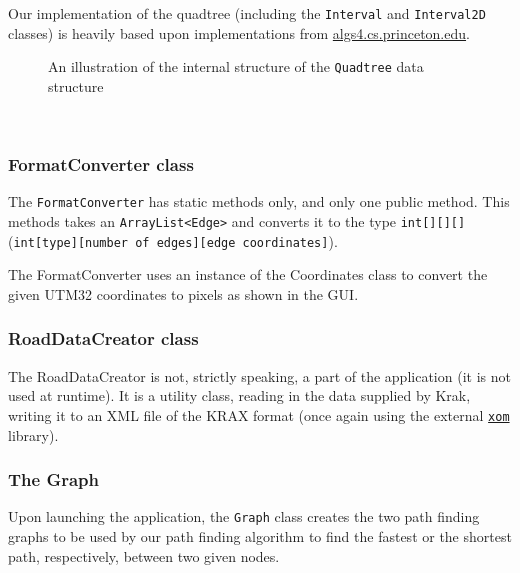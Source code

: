 \documentclass[a4paper,11pt]{article}
\begin{document}
Our implementation of the quadtree (including the \texttt{Interval} and \texttt{Interval2D} classes) is heavily based upon implementations from \url{algs4.cs.princeton.edu}.
\\
\begin{figure}[!h]
\centering
{}
	\caption{An illustration of the internal structure of the \texttt{Quadtree} data structure}
\end{figure}
\\
\subsubsection{FormatConverter class} %
The \texttt{FormatConverter} has static methods only, and only one public method. This methods takes an \texttt{ArrayList<Edge>} and converts it to the type \texttt{int[][][]} \\(\texttt{int[type][number of edges][edge coordinates]}).

The FormatConverter uses an instance of the Coordinates class to convert the given UTM32 coordinates to pixels as shown in the GUI.

\subsubsection{RoadDataCreator class} %
The RoadDataCreator is not, strictly speaking, a part of the application (it is not used at runtime). It is a utility class, reading in the data supplied by Krak, writing it to an XML file of the KRAX format (once again using the external \href{www.xom.nu}{\texttt{xom}} library).

\subsubsection{The Graph}
Upon launching the application, the \texttt{Graph} class creates the two path finding graphs to be used by our path finding algorithm to find the fastest or the shortest path, respectively, between two given nodes.
	
\end{document}
